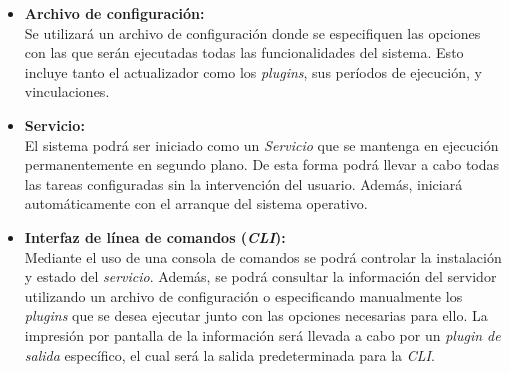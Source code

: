 \begin{itemize}
            \item \textbf{Archivo de configuración:} \\
                Se utilizará un archivo de configuración donde se especifiquen las opciones con las que serán ejecutadas todas las funcionalidades del sistema. Esto incluye tanto el actualizador como los \textit{plugins}, sus períodos de ejecución, y vinculaciones.
                
            \item \textbf{Servicio:} \\
                El sistema podrá ser iniciado como un \textit{Servicio} que se mantenga en ejecución permanentemente en segundo plano. De esta forma podrá llevar a cabo todas las tareas configuradas sin la intervención del usuario. Además, iniciará automáticamente con el arranque del sistema operativo.
                
            \item \textbf{Interfaz de línea de comandos (\textit{CLI}):} \\
                Mediante el uso de una consola de comandos se podrá controlar la instalación y estado del \textit{servicio}. Además, se podrá consultar la información del servidor utilizando un archivo de configuración o especificando manualmente los \textit{plugins} que se desea ejecutar junto con las opciones necesarias para ello. La impresión por pantalla de la información será llevada a cabo por un \textit{plugin de salida} específico, el cual será la salida predeterminada para la \textit{CLI}.
        \end{itemize}
